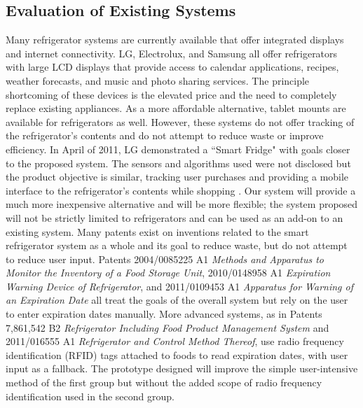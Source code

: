 \documentclass[11pt]{article} %
\begin{document}
\subsection{Evaluation of Existing Systems}
Many refrigerator systems are currently available that offer integrated displays and internet connectivity. LG, Electrolux, and Samsung all offer refrigerators with large LCD displays that provide access to calendar applications, recipes, weather forecasts, and music and photo sharing services. The principle shortcoming of these devices is the elevated price and the need to completely replace existing appliances. As a more affordable alternative, tablet mounts are available for refrigerators as well.
However, these systems do not offer tracking of the refrigerator's contents and do not attempt to reduce waste or improve efficiency. In April of 2011, LG demonstrated a ``Smart Fridge" with goals closer to the proposed system. The sensors and algorithms used were not disclosed but the product objective is similar, tracking user purchases and providing a mobile interface to the refrigerator's contents while shopping \cite{lg}. Our system will provide a much more inexpensive alternative and will be more flexible; the system proposed will not be strictly limited to refrigerators and can be used as an add-on to an existing system.
\newline \quad \newline
Many patents exist on inventions related to the smart refrigerator system as a whole and its goal to reduce waste, but do not attempt to reduce user input. Patents 2004/0085225 A1 \emph{Methods and Apparatus to Monitor the Inventory of a Food Storage Unit}, 2010/0148958 A1 \emph{Expiration Warning Device of Refrigerator}, and 2011/0109453 A1 \emph{Apparatus for Warning of an Expiration Date} all treat the goals of the overall system but rely on the user to enter expiration dates manually. More advanced systems, as in Patents 7,861,542 B2 \emph{Refrigerator Including Food Product Management System} and 2011/016555 A1 \emph {Refrigerator and Control Method Thereof}, use radio frequency identification (RFID) tags attached to foods to read expiration dates, with user input as a fallback. The prototype designed will improve the simple user-intensive method of the first group but without the added scope of radio frequency identification used in the second group.
\end{document}

